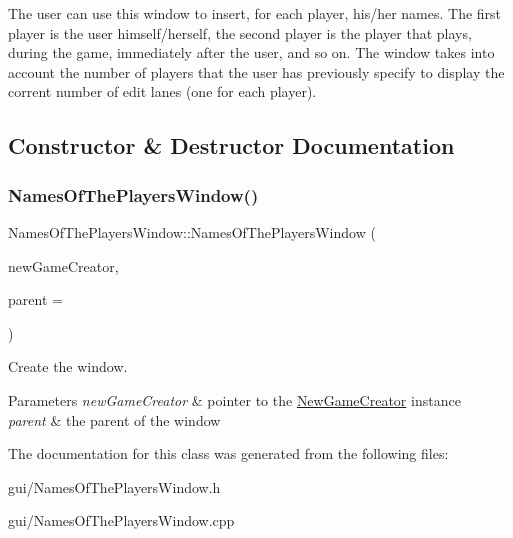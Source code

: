 The user can use this window to insert, for each player, his/her names. The first player is the user himself/herself, the second player is the player that plays, during the game, immediately after the user, and so on. The window takes into account the number of players that the user has previously specify to display the corrent number of edit lanes (one for each player). 

\subsection{Constructor \& Destructor Documentation}
\mbox{\label{classNamesOfThePlayersWindow_a199b485baab3f42c072a33e845cd35cf}} 
\subsubsection{\texorpdfstring{Names\+Of\+The\+Players\+Window()}{NamesOfThePlayersWindow()}}
{\footnotesize\ttfamily Names\+Of\+The\+Players\+Window\+::\+Names\+Of\+The\+Players\+Window (\begin{DoxyParamCaption}\item[{\hyperlink{classNewGameCreator}{New\+Game\+Creator} $\ast$}]{new\+Game\+Creator,  }\item[{Q\+Widget $\ast$}]{parent = {} }\end{DoxyParamCaption})}



Create the window. 


\begin{DoxyParams}{Parameters}
{\em new\+Game\+Creator} & pointer to the \hyperlink{classNewGameCreator}{New\+Game\+Creator} instance \\
\hline
{\em parent} & the parent of the window \\
\hline
\end{DoxyParams}


The documentation for this class was generated from the following files\+:\begin{DoxyCompactItemize}
\item 
gui/Names\+Of\+The\+Players\+Window.\+h\item 
gui/Names\+Of\+The\+Players\+Window.\+cpp\end{DoxyCompactItemize}
